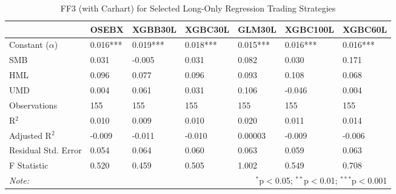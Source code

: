 \begin{table}[!htbp] \centering 
  \caption{FF3 (with Carhart) for Selected Long-Only Regression Trading Strategies} 
  \vspace{1em}
  \label{table:trading-ff3-selected-long-only-part1} 
\begin{tabularx}{\textwidth}{lXXXXXX} 
\toprule 
 & OSEBX & XGBB30L & XGBC30L & GLM30L & XGBC100L & XGBC60L \\ 
\midrule
Constant ($\alpha$) & 0.016*** & \cellcolor{lightlightgreen}0.019*** & 0.018*** & 0.015*** & 0.016*** & 0.016*** \\ 
SMB & 0.031 & -0.005 & 0.031 & 0.082 & 0.030 & 0.171 \\ 
HML & 0.096 & 0.077 & 0.096 & 0.093 & 0.108 & 0.068 \\ 
UMD & 0.004 & 0.061 & 0.031 & 0.106 & -0.046 & 0.004 \\ 
\midrule 
Observations & 155 & 155 & 155 & 155 & 155 & 155 \\ 
R$^{2}$ & 0.010 & 0.009 & 0.010 & 0.020 & 0.011 & 0.014 \\ 
Adjusted R$^{2}$ & -0.009 & -0.011 & -0.010 & 0.00003 & -0.009 & -0.006 \\ 
Residual Std. Error & 0.054 & 0.064 & 0.060 & 0.063 & 0.059 & 0.063 \\ 
F Statistic & 0.520 & 0.459 & 0.505 & 1.002 & 0.549 & 0.708 \\ 
\bottomrule 
\textit{Note:} & \multicolumn{6}{r}{$^{*}$p$<$0.05; $^{**}$p$<$0.01; $^{***}$p$<$0.001} \\ 
\end{tabularx} 
\end{table} 


